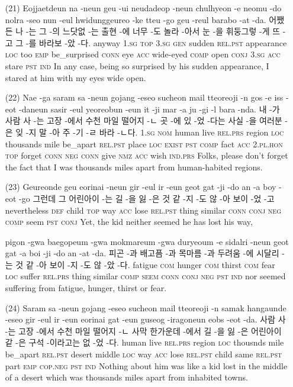 \begin{itemize}
\item [(21)]
\tgl
		{Eojjaetdeun na -neun geu -ui neudadeop -neun chulhyeon -e neomu -do nolra -seo nun -eul hwidunggeureo -ke tteu -go geu -reul barabo -at -da.}
		{어쨌든 나 -는 그 -의 느닷없 -는 출현 -에 너무 -도 놀라 -아서 눈 -을 휘둥그렇 -게 뜨 -고 그 -를 바라보 -았 -다.}
		{anyway	\textsc{1.sg}	\textsc{top}	\textsc{3.sg}	\textsc{gen}	sudden	\textsc{rel.pst}	appearance	\textsc{loc}	too	\textsc{emp}	be\_surprised	\textsc{conn}	eye	\textsc{acc}	wide-eyed	\textsc{comp}	open	\textsc{conj}	\textsc{3.sg}	\textsc{acc}	stare	\textsc{pst}	\textsc{ind}}
		{In any case, being so surprised by his sudden appearance, I stared at him with my eyes wide open.}
		
\item [(22)]
\tgl
		{Nae -ga saram sa -neun gojang -eseo sucheon mail tteoreoji -n gos -e iss -eot -daneun sasir -eul yeoreobun -eun it -ji mar -a ju -gi -l bara -nda.}
		{내 -가 사람 사 -는 고장 -에서 수천 마일 떨어지 -ㄴ 곳 -에 있 -었 -다는 사실 -을 여러분 -은 잊 -지 말 -아 주 -기 -ㄹ 바라 -ㄴ다.}
		{\textsc{1.sg}	\textsc{nom}	human	live	\textsc{rel.prs}	region	\textsc{loc}	thousands	mile	be\_apart	\textsc{rel.pst}	place	\textsc{loc}	\textsc{exist}	\textsc{pst}	\textsc{comp}	fact	\textsc{acc}	\textsc{2.pl.hon}	\textsc{top}	forget	\textsc{conn}	\textsc{neg}	\textsc{conn}	give	\textsc{nmz}	\textsc{acc}	wish	\textsc{ind.prs}}
		{Folks, please don't forget the fact that I was thousands miles apart from human-habited regions.}
		
\item [(23)]
\tgl
		{Geureonde geu eorinai -neun gir -eul ir -eun geot gat -ji -do an -a boy -eot -go}
		{그런데 그 어린아이 -는 길 -을 잃 -은 것 같 -지 -도 않 -아 보이 -었 -고}
		{nevertheless	\textsc{def}	child	\textsc{top}	way	\textsc{acc}	lose	\textsc{rel.pst}	thing	similar	\textsc{conn}	\textsc{conj}	\textsc{neg}	\textsc{comp}	seem	\textsc{pst}	\textsc{conj}}
		{Yet, the kid neither seemed he has lost his way,}
		
\tgl
		{pigon -gwa baegopeum -gwa mokmareum -gwa duryeoum -e sidalri -neun geot gat -a boi -ji -do an -at -da.}
		{피곤 -과 배고픔 -과 목마름 -과 두려움 -에 시달리 -는 것 같 -아 보이 -지 -도 않 -았 -다.}
		{fatigue	\textsc{com}	hunger	\textsc{com}	thirst	\textsc{com}	fear	\textsc{loc}	suffer	\textsc{rel.prs}	thing	similar	\textsc{comp}	\textsc{seem}	\textsc{conn}	\textsc{conj}	\textsc{neg}	\textsc{pst}	\textsc{ind}}
		{nor seemed suffering from fatigue, hunger, thirst or fear.}
		
\item [(24)]
\tgl
		{Saram sa -neun gojang -eseo sucheon mail tteoreoji -n samak hangaunde -eseo gir -eul ir -eun eorinai gat -eun guseog -iragoneun eobs -eot -da.}
		{사람 사 -는 고장 -에서 수천 마일 떨어지 -ㄴ 사막 한가운데 -에서 길 -을 잃 -은 어린아이 같 -은 구석 -이라고는 없 -었 -다.}
		{human	live	\textsc{rel.prs}	region	\textsc{loc}	thousnds	mile	be\_apart	\textsc{rel.pst}	desert	middle	\textsc{loc}	way	\textsc{acc}	lose	\textsc{rel.pst}	child	same	\textsc{rel.pst}	part	\textsc{emp}	\textsc{cop.neg}	\textsc{pst}	\textsc{ind}}
		{Nothing about him was like a kid lost in the middle of a desert which was thousands miles apart from inhabited towns.}
		

\end{itemize}
